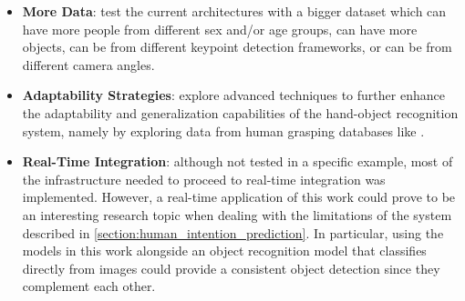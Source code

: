 \begin{itemize}
    \item \textbf{More Data}: test the current architectures with a bigger dataset which can have more people from different sex and/or age groups, can have more objects, can be from different keypoint detection frameworks, or can be from different camera angles.
    \item \textbf{Adaptability Strategies}: explore advanced techniques to further enhance the adaptability and generalization capabilities of the hand-object recognition system, namely by exploring data from human grasping databases like \cite{Saudabayev2018}.
    \item \textbf{Real-Time Integration}: although not tested in a specific example, most of the infrastructure needed to proceed to real-time integration was implemented. However, a real-time application of this work could prove to be an interesting research topic when dealing with the limitations of the system described in \autoref{section:human_intention_prediction}. In particular, using the models in this work alongside an object recognition model that classifies directly from images could provide a consistent object detection since they complement each other.
\end{itemize}


